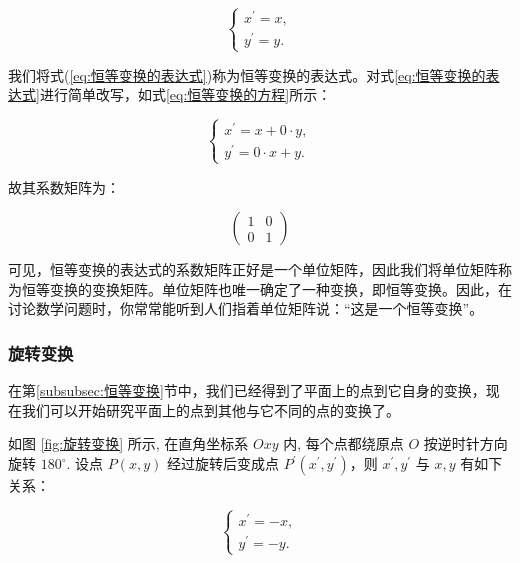 \begin{equation}
\left\{\begin{array}{l}
x^{\prime}=x, \\
y^{\prime}=y .
\end{array}\right.
\label{eq:恒等变换的表达式}
\end{equation}

我们将式(\ref{eq:恒等变换的表达式})称为恒等变换的表达式。对式\ref{eq:恒等变换的表达式}进行简单改写，如式\ref{eq:恒等变换的方程}所示：

\begin{equation}
\left\{\begin{array}{l}
x^{\prime}=x + 0\cdot y, \\
y^{\prime}= 0\cdot x + y .
\end{array}\right.
\label{eq:恒等变换的方程}
\end{equation}

故其系数矩阵为：

\begin{equation}
\left(\begin{array}{rr}
1  & 0 \\
0  & 1
\end{array}\right)
\label{eq:恒等变换矩阵}
\end{equation}

可见，恒等变换的表达式的系数矩阵正好是一个单位矩阵，因此我们将单位矩阵称为恒等变换的\textcolor{third}{变换矩阵}。单位矩阵也唯一确定了一种变换，即恒等变换。因此，在讨论数学问题时，你常常能听到人们指着单位矩阵说：“这是一个恒等变换”。

\subsubsection{旋转变换}
\label{subsubsec:旋转变换}

在第\ref{subsubsec:恒等变换}节中，我们已经得到了平面上的点到它自身的变换，现在我们可以开始研究平面上的点到其他与它不同的点的变换了。

如图 \ref{fig:旋转变换} 所示, 在直角坐标系 $O x y$ 内, 每个点都绕原点 $O$ 按逆时针方向旋转 $180^{\circ}$. 设点 $P(x, y)$ 经过旋转后变成点 $P^{\prime}\left(x^{\prime}, y^{\prime}\right)$，则 $x^{\prime}, y^{\prime}$ 与 $x, y$ 有如下关系：

\begin{equation}
\left\{\begin{array}{l}
x^{\prime}=-x, \\
y^{\prime}=-y .
\end{array}\right.
\label{eq:旋转变换的表达式}
\end{equation}


